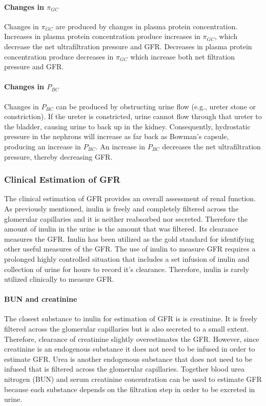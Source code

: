 \paragraph{Changes in $\pi_{GC}$}

Changes in $\pi_{GC}$ are produced by changes in plasma protein concentration. Increases in plasma protein concentration produce increases in $\pi_{GC}$, which decrease the net ultrafiltration pressure and GFR. Decreases in plasma protein concentration produce decreases in $\pi_{GC}$ which increase both net filtration pressure and GFR.

\paragraph{Changes in $P_{BC}$}

Changes in $P_{BC}$ can be produced by obstructing urine flow (e.g., ureter stone or constriction). If the ureter is constricted, urine cannot flow through that ureter to the bladder, causing urine to back up in the kidney. Consequently, hydrostatic pressure in the nephrons will increase as far back as Bowman’s capsule, producing an increase in $P_{BC}$. An increase in $P_{BC}$ decreases the net ultrafiltration pressure, thereby decreasing GFR. 


\subsubsection{Clinical Estimation of GFR}

The clinical estimation of GFR provides an overall assessment of renal function. As previously mentioned, inulin is freely and completely filtered across the glomerular capillaries and it is neither reabsorbed nor secreted. Therefore the amount of inulin in the urine is the amount that was filtered. Its clearance measures the GFR. Inulin has been utilized as the gold standard for identifying other useful measures of the GFR. The use of inulin to measure GFR requires a prolonged highly controlled situation that includes a set infusion of inulin and collection of urine for hours to record it’s clearance. Therefore, inulin is rarely utilized clinically to measure GFR.

\paragraph{BUN and creatinine}

The closest substance to inulin for estimation of GFR is is creatinine. It is freely filtered across the glomerular capillaries but is also secreted to a small extent. Therefore, clearance of creatinine slightly overestimates the GFR. However, since creatinine is an endogenous substance it does not need to be infused in order to estimate GFR. Urea is another endogenous substance that does not need to be infused that is filtered across the glomerular capillaries. Together blood urea nitrogen (BUN) and serum creatinine concentration can be used to estimate GFR because each substance depends on the filtration step in order to be excreted in urine. 

